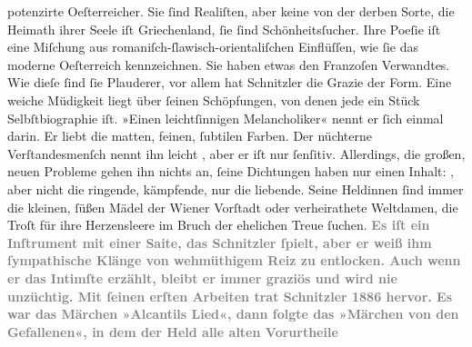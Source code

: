 \begin{ledgroupsized}[t]{13cm}
{{                  potenzirte Oeſterreicher. Sie ſind
                  Realiſten, aber keine von der derben Sorte, die Heimath ihrer Seele iſt Griechenland, ſie ſind Schönheitsſucher. Ihre
                  Poeſie iſt eine Miſchung aus romaniſch-ſlawisch-orientaliſchen Einflüſſen, wie ſie
                  das moderne Oeſterreich kennzeichnen. Sie
                  haben etwas den Franzoſen
                  Verwandtes. Wie dieſe ſind ſie Plauderer, vor allem hat Schnitzler die Grazie der
                  Form. Eine weiche Müdigkeit liegt über ſeinen Schöpfungen, von denen jede ein
                  Stück Selbſtbiographie iſt. »Einen leichtſinnigen Melancholiker« nennt er ſich einmal darin. Er liebt
                  die matten, feinen, ſubtilen Farben. Der nüchterne Verſtandesmenſch nennt ihn
                  leicht , aber er iſt nur ſenſitiv. Allerdings,
                  die großen, neuen Probleme gehen ihn nichts an, ſeine Dichtungen haben nur einen
                  Inhalt: , aber nicht die ringende, kämpfende,
                  nur die liebende. Seine Heldinnen ſind immer die kleinen, ſüßen Mädel der Wiener Vorſtadt oder verheirathete Weltdamen,
                  die Troſt für ihre Herzensleere im Bruch der ehelichen Treue ſuchen.}}\pend
           \pstart
           \textcolor{gray}{\textbf{Es iſt ein Inſtrument mit einer Saite, das Schnitzler ſpielt,
                  aber er weiß ihm ſympathische Klänge von wehmüthigem Reiz zu entlocken. Auch wenn
                  er das Intimſte erzählt, bleibt er immer graziös und wird nie unzüchtig. Mit
                  ſeinen erſten Arbeiten trat Schnitzler 1886 hervor. Es
                  war das Märchen »Alcantils
                     Lied«, dann folgte das »Märchen von den Gefallenen«, in dem der Held alle alten Vorurtheile
}}
\end{ledgroupsized}
